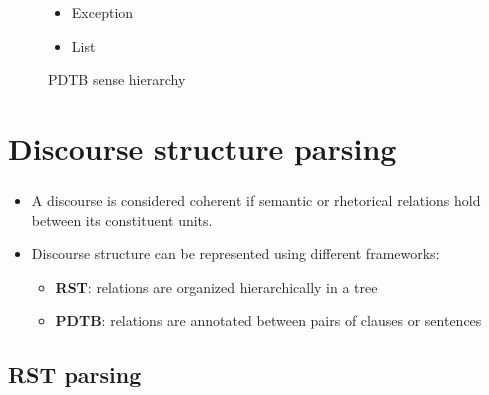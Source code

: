 \documentclass[xcolor=table]{beamer}
\begin{document}
\begin{frame}
\begin{figure}
\begin{tcolorbox}[colback=white, colframe=blue, boxrule=1pt, text width=.9\textwidth]
\begin{minipage}{.3\textwidth}
\begin{itemize}
\begin{itemize}
\begin{itemize}
						\item Conjunction
						\item Disjunction
						\item Chosen Alternative
					\end{itemize}
					\item Exception
					\item List
				\end{itemize}
			\end{itemize}
		\end{minipage}\vspace{-6pt}
		\end{tcolorbox}\vspace{-6pt}
		\caption{PDTB sense hierarchy \cite{2008-prasad-al}}
	\end{figure}
	
\end{frame}

\section{Discourse structure parsing}

\begin{frame}
	\frametitle{\insertshortsubtitle}
	\framesubtitle{\insertsection}
	
	\begin{itemize}
		\item A discourse is considered coherent if semantic or rhetorical relations hold between its constituent units.
		\item Discourse structure can be represented using different frameworks:
		\begin{itemize}
			\item \textbf{RST}: relations are organized hierarchically in a tree
			\item \textbf{PDTB}: relations are annotated between pairs of clauses or sentences
		\end{itemize}
	\end{itemize}
	
\end{frame}

\subsection{RST parsing}
\end{document}

